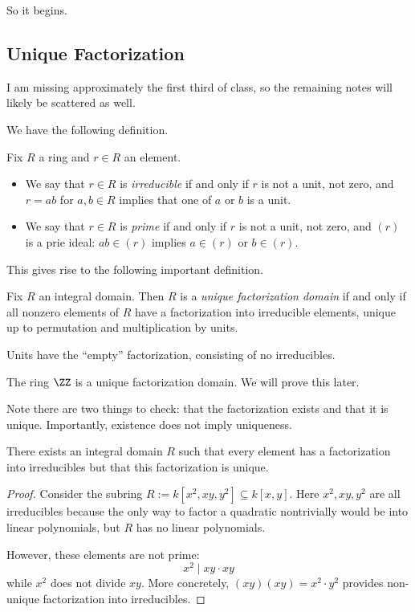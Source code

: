 







So it begins.

\subsection{Unique Factorization}
\begin{warn}
	I am missing approximately the first third of class, so the remaining notes will likely be scattered as well.
\end{warn}
We have the following definition.
\begin{definition}
	Fix $R$ a ring and $r\in R$ an element.
	\begin{itemize}
		\item We say that $r\in R$ is \textit{irreducible} if and only if $r$ is not a unit, not zero, and $r=ab$ for $a,b\in R$ implies that one of $a$ or $b$ is a unit.
		\item We say that $r\in R$ is \textit{prime} if and only if $r$ is not a unit, not zero, and $(r)$ is a prie ideal: $ab\in(r)$ implies $a\in(r)$ or $b\in(r)$.
	\end{itemize}
\end{definition}
This gives rise to the following important definition.
\begin{definition}
	Fix $R$ an integral domain. Then $R$ is a \textit{unique factorization domain} if and only if all nonzero elements of $R$ have a factorization into irreducible elements, unique up to permutation and multiplication by units.
\end{definition}
\begin{remark}
	Units have the ``empty'' factorization, consisting of no irreducibles.
\end{remark}
\begin{example}
	The ring $\ZZ$ is a unique factorization domain. We will prove this later.
\end{example}
Note there are two things to check: that the factorization exists and that it is unique. Importantly, existence does not imply uniqueness.
\begin{exe}
	There exists an integral domain $R$ such that every element has a factorization into irreducibles but that this factorization is unique.
\end{exe}
\begin{proof}
	Consider the subring $R:=k\left[x^2,xy,y^2\right]\subseteq k[x,y]$. Here $x^2,xy,y^2$ are all irreducibles because the only way to factor a quadratic nontrivially would be into linear polynomials, but $R$ has no linear polynomials.
	
	However, these elements are not prime:
	\[x^2\mid xy\cdot xy\]
	while $x^2$ does not divide $xy$. More concretely, $(xy)(xy)=x^2\cdot y^2$ provides non-unique factorization into irreducibles.
\end{proof}

